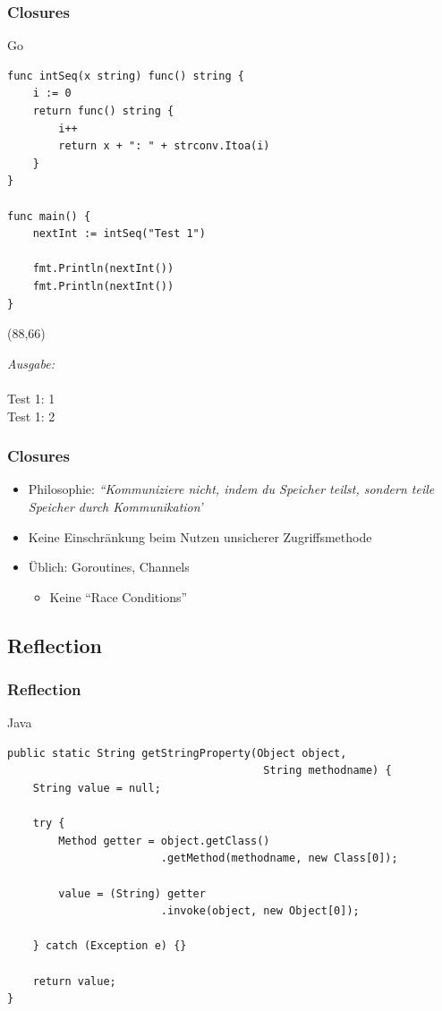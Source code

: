\documentclass{beamer}
\begin{document}
\begin{frame}[fragile]
\frametitle{Closures}

Go
\begin{lstlisting}
func intSeq(x string) func() string {
	i := 0
	return func() string {
		i++
		return x + ": " + strconv.Itoa(i)
	}
}

func main() {
	nextInt := intSeq("Test 1")

	fmt.Println(nextInt())
	fmt.Println(nextInt())
}
\end{lstlisting}

\begin{textblock}{36}(88,66)
\begin{tcolorbox}
\textit{Ausgabe:\\}\\
Test 1: 1 \\
Test 1: 2
\end{tcolorbox}
\end{textblock}

\end{frame}

\begin{frame}
\frametitle{Closures}

\begin{itemize}
\setlength{\itemsep}{24pt}
\item Philosophie: \textit{``Kommuniziere nicht, indem du Speicher teilst, sondern teile Speicher durch Kommunikation'}
\item Keine Einschr\"ankung beim Nutzen unsicherer Zugriffsmethode
\item \"Ublich: Goroutines, Channels
\begin{itemize}
\item Keine ``Race Conditions''
\end{itemize}
\end{itemize}

\end{frame}

\subsection{Reflection}
\begin{frame}[fragile]
\frametitle{Reflection}

Java
\lstset{language=Java, basicstyle=\scriptsize}
\begin{lstlisting}
public static String getStringProperty(Object object, 
                                        String methodname) {
    String value = null;

    try {
        Method getter = object.getClass()
                        .getMethod(methodname, new Class[0]);

        value = (String) getter
                        .invoke(object, new Object[0]);

    } catch (Exception e) {}

    return value;
}
\end{lstlisting}

\end{frame}
\end{document}
